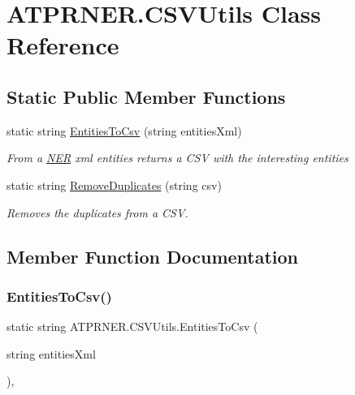 \hypertarget{class_a_t_p_r_n_e_r_1_1_c_s_v_utils}{}\section{A\+T\+P\+R\+N\+E\+R.\+C\+S\+V\+Utils Class Reference}
\label{class_a_t_p_r_n_e_r_1_1_c_s_v_utils}
\subsection*{Static Public Member Functions}
\begin{DoxyCompactItemize}
\item 
static string \hyperlink{class_a_t_p_r_n_e_r_1_1_c_s_v_utils_adfa299109e3212e72e6468644b0bdd0c}{Entities\+To\+Csv} (string entities\+Xml)
\begin{DoxyCompactList}\small\item\em From a \hyperlink{class_a_t_p_r_n_e_r_1_1_n_e_r}{N\+ER} xml entities returns a C\+SV with the interesting entities \end{DoxyCompactList}\item 
static string \hyperlink{class_a_t_p_r_n_e_r_1_1_c_s_v_utils_ab236c362e83053e0e7165aa2e45849c4}{Remove\+Duplicates} (string csv)
\begin{DoxyCompactList}\small\item\em Removes the duplicates from a C\+SV. \end{DoxyCompactList}\end{DoxyCompactItemize}


\subsection{Member Function Documentation}
\hypertarget{class_a_t_p_r_n_e_r_1_1_c_s_v_utils_adfa299109e3212e72e6468644b0bdd0c}{}\label{class_a_t_p_r_n_e_r_1_1_c_s_v_utils_adfa299109e3212e72e6468644b0bdd0c} 
\subsubsection{\texorpdfstring{Entities\+To\+Csv()}{EntitiesToCsv()}}
{\footnotesize\ttfamily static string A\+T\+P\+R\+N\+E\+R.\+C\+S\+V\+Utils.\+Entities\+To\+Csv (\begin{DoxyParamCaption}\item[{string}]{entities\+Xml }\end{DoxyParamCaption})\hspace{0.3cm}{\ttfamily [inline]}, {\ttfamily [static]}}



